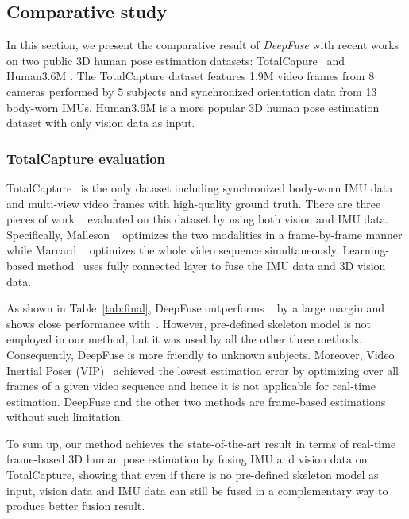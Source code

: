 \documentclass[10pt,twocolumn,letterpaper]{article}
\begin{document}
\subsection{Comparative study}


In this section, we present the comparative result of \emph{DeepFuse} with recent works on two public 3D human pose estimation datasets: TotalCapure~\cite{trumble2017total} and Human3.6M \cite{h36m_pami}. The TotalCapture dataset features 1.9M video frames from 8 cameras performed by 5 subjects and synchronized orientation data from 13 body-worn IMUs. Human3.6M is a more popular 3D human pose estimation dataset with only vision data as input. 

\vspace{-0.3cm}
\subsubsection{TotalCapture evaluation}
\label{sec:tc_eval}
TotalCapture~\cite{trumble2017total} is the only dataset including synchronized body-worn IMU data and multi-view video frames with high-quality ground truth. There are three pieces of work ~\cite{trumble2017total,malleson2017real,von2018recovering} evaluated on this dataset by using both vision and IMU data. Specifically, Malleson \etal~\cite{malleson2017real} optimizes the two modalities in a frame-by-frame manner while Marcard \etal~\cite{von2018recovering} optimizes the whole video sequence simultaneously. Learning-based method~\cite{trumble2017total} uses fully connected layer to fuse the IMU data and 3D vision data. 

As shown in Table~\ref{tab:final}, DeepFuse outperforms ~\cite{trumble2017total,malleson2017real} by a large margin and shows close performance with~\cite{von2018recovering}. However, pre-defined skeleton model is not employed in our method, but it was used by all the other three methods. Consequently, DeepFuse is more friendly to unknown subjects. Moreover, Video Inertial Poser (VIP)~\cite{von2018recovering} achieved the lowest estimation error by optimizing over all frames of a given video sequence and hence it is not applicable for real-time estimation. DeepFuse and the other two methods are frame-based estimations without such limitation. 


To sum up, our method achieves the state-of-the-art result in terms of real-time frame-based 3D human pose estimation by fusing IMU and vision data on TotalCapture, showing that even if there is no pre-defined skeleton model as input, vision data and IMU data can still be fused in a complementary way to produce better fusion result.  
\end{document}
